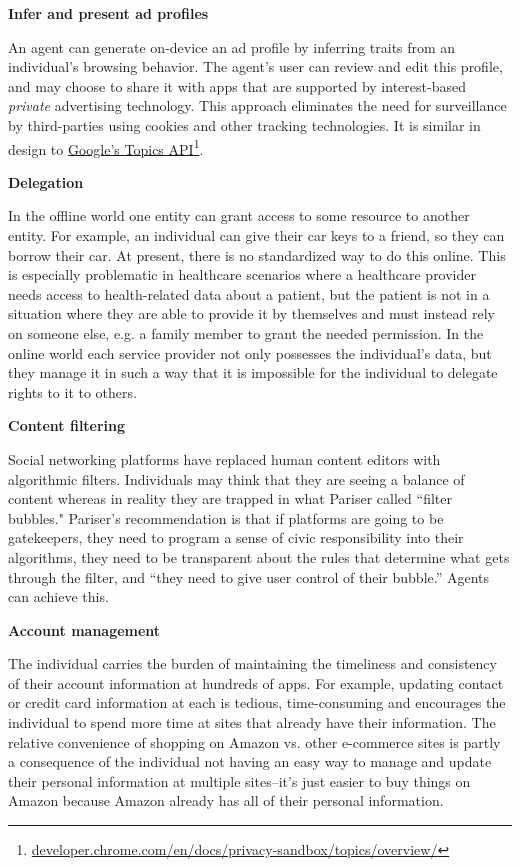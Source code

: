 \documentclass[11pt, oneside]{article}   	%
\newcommand{\hyperfootnote}[1][]{\def\ArgI{{#1}}\hyperfootnoteRelay}
\newcommand\hyperfootnoteRelay[2][]{\href{#1#2}{\ArgI}\footnote{\href{#1#2}{#2}}}
\begin{document}
\textbf{Infer and present ad profiles}

An agent can generate on-device an ad profile by inferring traits from an individual's browsing behavior. The agent's user can review and edit this profile, and may choose to share it with apps that are supported by interest-based \emph{private} advertising technology. This approach eliminates the need for surveillance by third-parties using cookies and other tracking technologies. It is similar in design to \hyperfootnote[Google's Topics API][https://]{developer.chrome.com/en/docs/privacy-sandbox/topics/overview/}.

\textbf{Delegation}

In the offline world one entity can grant access to some resource to another entity. For example, an individual can give their car keys to a friend, so they can borrow their car. At present, there is no standardized way to do this online. This is especially problematic in healthcare scenarios where a healthcare provider needs access to health-related data about a patient, but the patient is not in a situation where they are able to provide it by themselves and must instead rely on someone else, e.g. a family member to grant the needed permission. In the online world each service provider not only possesses the individual's data, but they manage it in such a way that it is impossible for the individual to delegate rights to it to others. 

\textbf{Content filtering}

Social networking platforms have replaced human content editors with algorithmic filters. Individuals may think that they are seeing a balance of content whereas in reality they are trapped in what Pariser called ``filter bubbles."\cite{Pariser2011} Pariser's recommendation is that if platforms are going to be gatekeepers, they need to program a sense of civic responsibility into their algorithms, they need to be transparent about the rules that determine what gets through the filter, and ``they need to give user control of their bubble.''\cite[p66]{McNamee2020} Agents can achieve this.

\textbf{Account management} 

The individual carries the burden of maintaining the timeliness and consistency of their account information at hundreds of apps. For example, updating contact or credit card information at each is tedious, time-consuming and encourages the individual to spend more time at sites that already have their information. The relative convenience of shopping on Amazon vs. other e-commerce sites is partly a consequence of the individual not having an easy way to manage and update their personal information at multiple sites--it's just easier to buy things on Amazon because Amazon already has all of their personal information.
\end{document}
